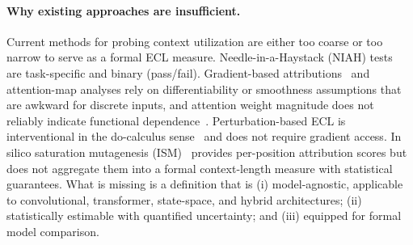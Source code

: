 \paragraph{Why existing approaches are insufficient.}
Current methods for probing context utilization are either too coarse or too narrow to serve as a formal ECL measure. Needle-in-a-Haystack (NIAH) tests~\citep{Hsieh2024RULER} are task-specific and binary (pass/fail). Gradient-based attributions~\citep{Sundararajan2017IG} and attention-map analyses rely on differentiability or smoothness assumptions that are awkward for discrete inputs, and attention weight magnitude does not reliably indicate functional dependence~\citep{Kendiukhov2026MechInterp}. Perturbation-based ECL is interventional in the do-calculus sense~\citep{Pearl2009Causality} and does not require gradient access. In silico saturation mutagenesis (ISM)~\citep{Nair2022fastISM} provides per-position attribution scores but does not aggregate them into a formal context-length measure with statistical guarantees. What is missing is a definition that is (i) model-agnostic, applicable to convolutional, transformer, state-space, and hybrid architectures; (ii) statistically estimable with quantified uncertainty; and (iii) equipped for formal model comparison.

